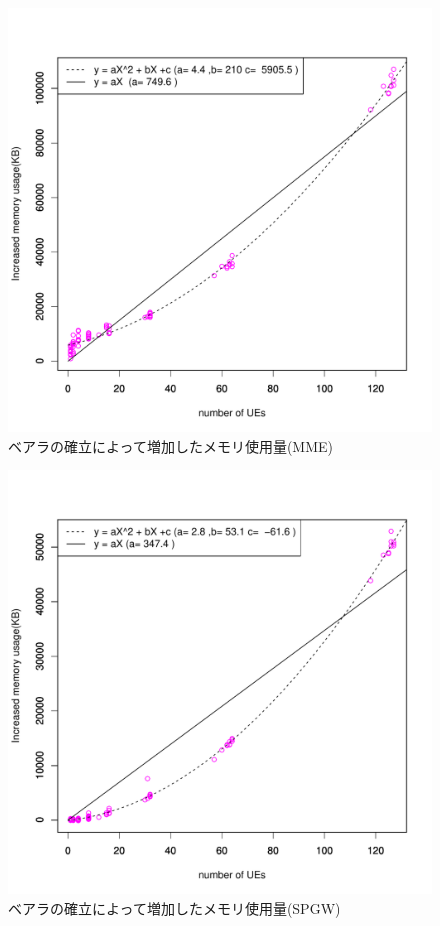 \documentclass[a4j]{ujarticle}
\begin{document}
\begin{figure}[htbp]
	\centering
	\includegraphics[width=0.7\hsize]{mme_memory.pdf}
  \caption{ベアラの確立によって増加したメモリ使用量(MME)}
	\label{mme_memory}
\end{figure}

\begin{figure}[htbp]
	\centering
	\includegraphics[width=0.7\hsize]{spgw_memory.pdf}
  \caption{ベアラの確立によって増加したメモリ使用量(SPGW)}
	\label{spgw_memory}
\end{figure}
\end{document}
